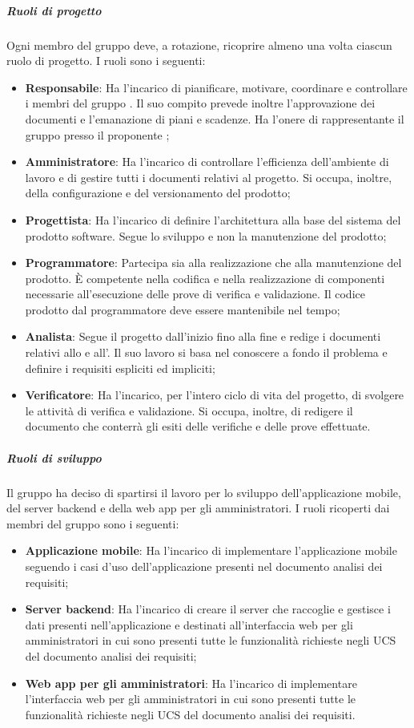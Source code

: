 \subparagraph*{Ruoli di progetto}
Ogni membro del gruppo deve, a rotazione, ricoprire almeno una volta ciascun ruolo di progetto.
I ruoli sono i seguenti:
\begin{itemize}
	\item \textbf{Responsabile}: Ha l'incarico di pianificare, motivare, coordinare e controllare i membri del gruppo \Gruppo{}.
	Il suo compito prevede inoltre l'approvazione dei documenti e l'emanazione di piani e scadenze.
	Ha l'onere di rappresentante il gruppo presso il proponente \Proponente{};
	\item \textbf{Amministratore}: Ha l'incarico di controllare l'efficienza dell'ambiente di lavoro e di gestire tutti i documenti relativi al progetto.
	Si occupa, inoltre, della configurazione e del versionamento del prodotto;
	\item \textbf{Progettista}: Ha l'incarico di definire l'architettura alla base del sistema del prodotto software.
	Segue lo sviluppo e non la manutenzione del prodotto;
	\item \textbf{Programmatore}: Partecipa sia alla realizzazione che alla manutenzione del prodotto.
	È competente nella codifica e nella realizzazione di componenti necessarie all’esecuzione delle prove di verifica e validazione.
	Il codice prodotto dal programmatore deve essere mantenibile nel tempo;
	\item \textbf{Analista}: Segue il progetto dall'inizio fino alla fine e redige i documenti relativi allo \SdF{} e all'\AdR{}.
	Il suo lavoro si basa nel conoscere a fondo il problema e definire i requisiti espliciti ed impliciti;
	\item \textbf{Verificatore}: Ha l'incarico, per l'intero ciclo di vita del progetto, di svolgere le attività di verifica e validazione.
	Si occupa, inoltre, di redigere il documento \PdQ{} che conterrà gli esiti delle verifiche e delle prove effettuate.
\end{itemize}

\subparagraph*{Ruoli di sviluppo}
Il gruppo ha deciso di spartirsi il lavoro per lo sviluppo dell'applicazione mobile, del server backend e della web app per gli amministratori. 
I ruoli ricoperti dai membri del gruppo sono i seguenti:
\begin{itemize}
	\item \textbf{Applicazione mobile}: Ha l'incarico di implementare l'applicazione mobile seguendo i casi d'uso dell'applicazione presenti nel documento analisi dei requisiti;
	\item \textbf{Server backend}: Ha l'incarico di creare il server che raccoglie e gestisce i dati presenti nell'applicazione e destinati all'interfaccia web per gli amministratori in cui sono presenti tutte le funzionalità richieste negli UCS del documento analisi dei requisiti;
	\item \textbf{Web app per gli amministratori}: Ha l'incarico di implementare l'interfaccia web per gli amministratori in cui sono presenti tutte le funzionalità richieste negli UCS del documento analisi dei requisiti.
\end{itemize}

